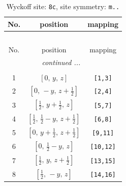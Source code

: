 \documentclass[fleqn,8pt]{jsarticle}
\begin{document}
\begin{longtable}{ccc}
\caption{Wyckoff site: {\tt 8c}, site symmetry: {\tt m..}}
 \\
 \hline \hline
No. & position & mapping \\ \hline \endfirsthead

\multicolumn{2}{l}{\tablename\ \thetable{}} \\
 \hline \hline
No. & position & mapping \\ \hline \endhead

 \hline \hline
\multicolumn{2}{r}{\footnotesize\it continued ...} \\ \endfoot

 \hline \hline
\multicolumn{2}{r}{} \\ \endlastfoot

1 & $\left[ 0,\, y,\, z \right]$ & {\tt [1,3]} \\ \hline
2 & $\left[ 0,\, - y,\, z + \frac{1}{2} \right]$ & {\tt [2,4]} \\ \hline
3 & $\left[ \frac{1}{2},\, y + \frac{1}{2},\, z \right]$ & {\tt [5,7]} \\ \hline
4 & $\left[ \frac{1}{2},\, \frac{1}{2} - y,\, z + \frac{1}{2} \right]$ & {\tt [6,8]} \\ \hline
5 & $\left[ 0,\, y + \frac{1}{2},\, z + \frac{1}{2} \right]$ & {\tt [9,11]} \\ \hline
6 & $\left[ 0,\, \frac{1}{2} - y,\, z \right]$ & {\tt [10,12]} \\ \hline
7 & $\left[ \frac{1}{2},\, y,\, z + \frac{1}{2} \right]$ & {\tt [13,15]} \\ \hline
8 & $\left[ \frac{1}{2},\, - y,\, z \right]$ & {\tt [14,16]} \\
\end{longtable}
\renewcommand{\arraystretch}{1.2}
\end{document}
